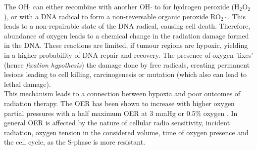 The OH$\cdot$ can either recombine with another OH$\cdot$ to for hydrogen peroxide (H$_2$O$_2$), or with a DNA radical to form a non-reversable organic peroxide RO$_2\cdot$. This leads to a non-repairable state of the DNA radical, causing cell death. Therefore, abundance of oxygen leads to a chemical change in the radiation damage formed in the DNA. These reactions are limited, if tumour regions are hypoxic, yielding in a higher probability of DNA repair and recovery. The presence of oxygen 'fixes' (hence \textit{fixation hypothesis}) the damage done by free radicals, creating permanent lesions leading to cell killing, carcinogenesis or mutation (which also can lead to lethal damage).\\This mechanism leads to a connection between hypoxia and poor outcomes of radiation therapy. The OER has been shown to increase with higher oxygen partial pressures with a half maximum OER at 3 mmHg or 0.5\% oxygen \cite{ pmid15183486}. In general OER is affected by the nature of cellular radio sensitivity, incident radiation, oxygen tension in the considered volume, time of oxygen presence and the cell cycle, as the S-phase is more resistant.
